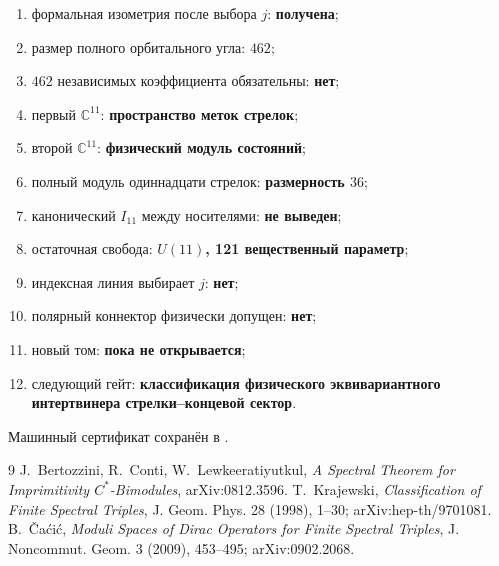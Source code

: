 \begin{protocol}
\begin{enumerate}
 \item формальная изометрия после выбора $j$: \textbf{получена};
 \item размер полного орбитального угла: \textbf{$462$};
 \item $462$ независимых коэффициента обязательны: \textbf{нет};
 \item первый $\mathbb C^{11}$: \textbf{пространство меток стрелок};
 \item второй $\mathbb C^{11}$: \textbf{физический модуль состояний};
 \item полный модуль одиннадцати стрелок: \textbf{размерность $36$};
 \item канонический $I_{11}$ между носителями: \textbf{не выведен};
 \item остаточная свобода: \textbf{$U(11)$, 121 вещественный параметр};
 \item индексная линия выбирает $j$: \textbf{нет};
 \item полярный коннектор физически допущен: \textbf{нет};
 \item новый том: \textbf{пока не открывается};
 \item следующий гейт: \textbf{классификация физического эквивариантного
 интертвинера стрелки--концевой сектор}.
\end{enumerate}
\end{protocol}

Машинный сертификат сохранён в
.

\begin{thebibliography}{9}
J.~Bertozzini, R.~Conti, W.~Lewkeeratiyutkul,
\emph{A Spectral Theorem for Imprimitivity $C^*$-Bimodules},
arXiv:0812.3596.
T.~Krajewski,
\emph{Classification of Finite Spectral Triples},
J. Geom. Phys. 28 (1998), 1--30; arXiv:hep-th/9701081.
B.~\v{C}a\'ci\'c,
\emph{Moduli Spaces of Dirac Operators for Finite Spectral Triples},
J. Noncommut. Geom. 3 (2009), 453--495; arXiv:0902.2068.
\end{thebibliography}